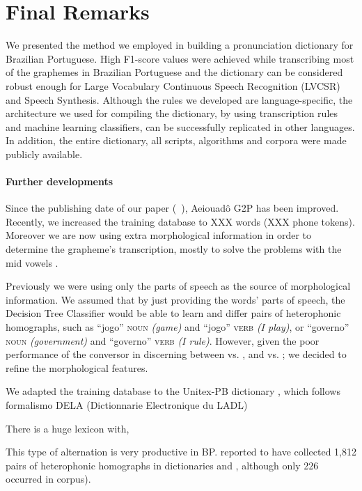 \section{Final Remarks}

We presented the method we employed in building a pronunciation dictionary for Brazilian Portuguese. High F1-score 
values were achieved while transcribing most of the graphemes in Brazilian Portuguese and the dictionary can be
considered robust enough for Large Vocabulary Continuous Speech Recognition (LVCSR) and Speech Synthesis. Although 
the rules we developed are language-specific, the architecture we used for compiling the dictionary, by using transcription
rules and machine learning classifiers, can be successfully replicated in other languages. In addition, the entire dictionary,
all scripts, algorithms and corpora were made publicly available.

\paragraph{Further developments}

Since the publishing date of our paper (\citeauthor{Mendonca2014}~\cite{Mendonca2014}), Aeiouad\^o \ac{G2P} has been improved. Recently, we increased the training database to XXX words (XXX phone tokens). Moreover we are now using extra morphological information in order to determine the grapheme's transcription, mostly to solve the problems with the mid vowels \textipa{[E, e, O, o]}. 

Previously we were using only the parts of speech as the source of morphological information. We assumed that by just providing the words' parts of speech, the Decision Tree Classifier would be able to learn and differ pairs of heterophonic homographs, such as ``jogo'' \textsc{noun} \emph{(game)} and ``jogo'' \textsc{verb} \emph{(I play)}, or ``governo'' \textsc{noun} \emph{(government)} and ``governo'' \textsc{verb} \emph{(I rule)}. However, given the poor performance of the conversor in discerning between \textipa{[E]} vs. \textipa{[e]}, and \textipa{[O]} vs. \textipa{[o]}; we decided to refine the morphological features. 

We adapted the training database to the Unitex-PB dictionary \cite{Muniz2004}, which follows  formalismo DELA (Dictionnarie Electronique du LADL)

There is a huge lexicon with,

This type of alternation is very productive in \ac{BP}.  reported to have collected 1,812 pairs of heterophonic homographs in dictionaries and , although only 226 occurred in corpus).


